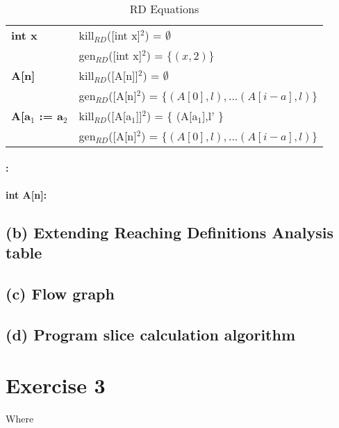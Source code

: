 \documentclass[12pt]{article}
\begin{document}
\begin{table}[h]
    \begin{tabular}{l | l }
    \textbf{int x} &  kill$_{RD}$([int x]$^2$) = $\emptyset$ \\
                   &  gen$_{RD}$([int x]$^2$) = $\{(x,2)\}$ \\
    \hline
    \textbf{A[n]} & kill$_{RD}$([A[n]]$^2$) = $\emptyset$\\
                  & gen$_{RD}$([A[n]$^2$) = $\{(A[0],l), ... (A[i-a],l)\}$ \\

    \hline
    \textbf{A[a$_1$ := a$_2$} & kill$_{RD}$([A[a$_1$]]$^2$) = \{ (A[a$_1$],l' \} \\
                              & gen$_{RD}$([A[n]$^2$) = $\{(A[0],l), ... (A[i-a],l)\}$ \\

    \end{tabular}
    \centering
	\caption{RD Equations}
	\label{table:rd_equations}
\end{table}


\paragraph*{:}

\paragraph*{int A[n]:}


\subsection*{(b) Extending Reaching Definitions Analysis table}
\subsection*{(c) Flow graph}
\subsection*{(d) Program slice calculation algorithm}
\section*{Exercise 3}

Where 
\end{document}
